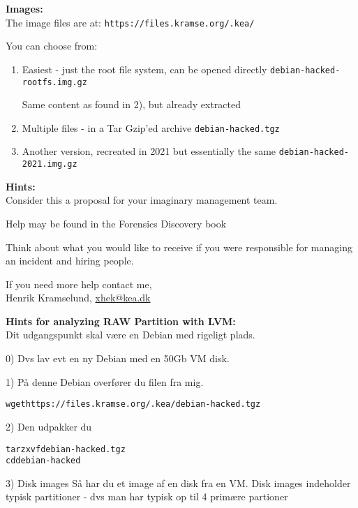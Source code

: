 \documentclass[a4paper,11pt,notitlepage,landscape]{report}
\begin{document}
{\bf Images:}\\
The image files are at:
\verb+https://files.kramse.org/.kea/+

You can choose from:

\begin{enumerate}
\item Easiest - just the root file system, can be opened directly
 \verb+debian-hacked-rootfs.img.gz+

Same content as found in 2), but already extracted

\item Multiple files - in a Tar Gzip'ed archive
\verb+debian-hacked.tgz+

\item Another version, recreated in 2021 but essentially the same
\verb+debian-hacked-2021.img.gz+

\end{enumerate}



{\bf Hints:}\\
Consider this a proposal for your imaginary management team.

Help may be found in the Forensics Discovery book

Think about what you would like to receive if you were responsible for managing an incident and hiring people.

If you need more help contact me,\\


Henrik Kramselund, \url{xhek@kea.dk}

\eject
{\bf Hints for analyzing RAW Partition with LVM:}\\


Dit udgangspunkt skal være en Debian med rigeligt plads.

0) Dvs lav evt en ny Debian med en 50Gb VM disk.


1) På denne Debian overfører du filen fra mig.

\begin{alltt}
wget https://files.kramse.org/.kea/debian-hacked.tgz
\end{alltt}

2) Den udpakker du

\begin{alltt}
tar zxvf debian-hacked.tgz
cd debian-hacked
\end{alltt}

3) Disk images
Så har du et image af en disk fra en VM. Disk images indeholder typisk
partitioner - dvs man har typisk op til 4 primære partioner
\end{document}
